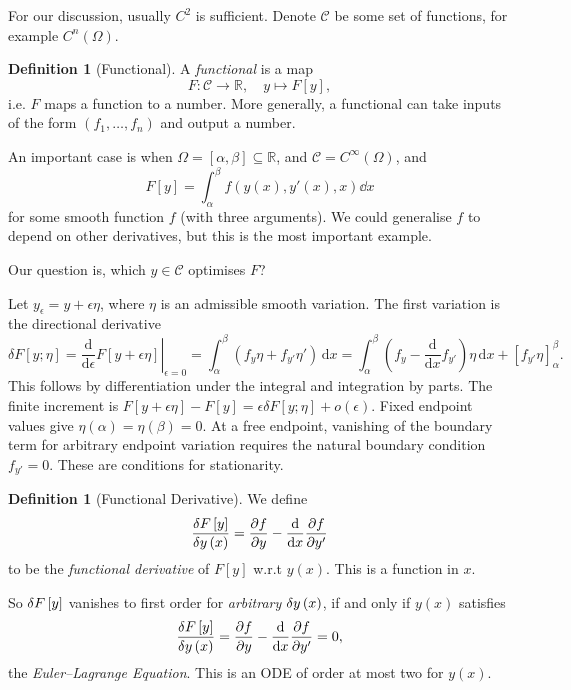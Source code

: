\documentclass[11pt]{article}
\numberwithin{equation}{section}
\theoremstyle{definition}
\newtheorem{definition}[theorem]{Definition}
\theoremstyle{remark}
\newcommand{\pqty}[1]{\left(#1\right)}
\newcommand{\bqty}[1]{\left[#1\right]}
\newcommand{\ccintv}[2]{[#1,#2]}
\newcommand{\function}[5]{#1:#2\to #3,\quad #4\mapsto #5}
\newcommand{\RR}{\mathbb{R}}
\newcommand{\contClass}[1]{C^{#1}}
\newcommand{\smoothClass}{C^\infty}
\newcommand{\contClassSymb}{\mathcal{C}}
\newcommand{\fdv}[2]{\frac{\delta #1}{\delta #2}}
\begin{document}
For our discussion, usually \(\contClass{2}\) is sufficient. Denote \(\contClassSymb\) be some set of functions, for example \(\contClass{n} \pqty{\Omega}\).

\begin{definition}[Functional]\label{variation-unit-0041}
    A \emph{functional} is a map
    \[
        \function{F}{\contClassSymb}{\RR}{y}{F\bqty{y},}
    \]
    i.e. \(F\) maps a function to a number. More generally, a functional can take inputs of the form \(\pqty{f_1, \ldots, f_n}\) and output a number.
\end{definition}

An important case is when \(\Omega = \ccintv{\alpha}{\beta} \subseteq \RR\), and \(\contClassSymb = \smoothClass \pqty{\Omega}\), and
\[
    F\bqty{y} = \int_{\alpha}^{\beta} f\pqty{y \pqty{x}, y' \pqty{x}, x} \dd{x}
\]
for some smooth function \(f\) (with three arguments). We could generalise \(f\) to depend on other derivatives, but this is the most important example.

Our question is, which \(y \in \contClassSymb\) optimises \(F\)?

Let \(y_\epsilon=y+\epsilon\eta\), where \(\eta\) is an admissible smooth variation.
The first variation is the directional derivative
\[
\delta F[y;\eta]=\left.\frac{\mathrm d}{\mathrm d\epsilon}F[y+\epsilon\eta]\right|_{\epsilon=0}
=\int_\alpha^\beta(f_y\eta+f_{y'}\eta')\,\mathrm dx
=\int_\alpha^\beta\left(f_y-\frac{\mathrm d}{\mathrm dx}f_{y'}\right)\eta\,\mathrm dx
+[f_{y'}\eta]_\alpha^\beta.
\]
This follows by differentiation under the integral and integration by parts.
The finite increment is \(F[y+\epsilon\eta]-F[y]=\epsilon\delta F[y;\eta]+o(\epsilon)\).
Fixed endpoint values give \(\eta(\alpha)=\eta(\beta)=0\). At a free endpoint,
vanishing of the boundary term for arbitrary endpoint variation requires the natural
boundary condition \(f_{y'}=0\). These are conditions for stationarity.

\begin{definition}[Functional Derivative]\label{variation-unit-0042}
    \label{def:functional-derivative}%
    We define
    \[
        \fdv{F\bqty{y}}{y\pqty{x}} = \pdv{f}{y} - \dv{x} \pdv{f}{y'}
    \]
    to be the \emph{functional derivative} of \(F\bqty{y}\) w.r.t \(y\pqty{x}\). This is a function in \(x\).
\end{definition}

So \(\var{F\bqty{y}}\) vanishes to first order for \emph{arbitrary} \(\var{y\pqty{x}}\), if and only if \(y\pqty{x}\) satisfies
\begin{equation}
    \fdv{F\bqty{y}}{y\pqty{x}} = \pdv{f}{y} - \dv{x} \pdv{f}{y'} = 0,
    \label{eq:euler-lagrange}
\end{equation}
the \emph{Euler--Lagrange Equation}. This is an ODE of order at most two for \(y\pqty{x}\).
\end{document}
